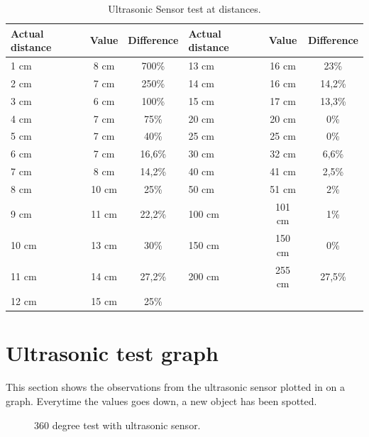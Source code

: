 \begin{table}[H]
	\centering
    \begin{tabular}{|lcc|lcc|}
    \hline  
    \rowcolor{DGray}
    \textbf{Actual distance} & \textbf{Value}  & \textbf{Difference} &\textbf{Actual distance} & \textbf{Value}  & \textbf{Difference}\\ \hline
    1 cm     & 8 cm     & 700\%  &    13 cm     & 16 cm     & 23\% \\
    2 cm     & 7 cm     & 250\%  &    14 cm     & 16 cm     & 14,2\% \\
    3 cm     & 6 cm     & 100\%  &    15 cm     & 17 cm     & 13,3\% \\
    4 cm     & 7 cm     & 75\%   &    20 cm     & 20 cm     & 0\% \\
    5 cm     & 7 cm     & 40\%   &    25 cm     & 25 cm     & 0\% \\
    6 cm     & 7 cm     & 16,6\% &    30 cm     & 32 cm     & 6,6\% \\
    7 cm     & 8 cm     & 14,2\% &    40 cm     & 41 cm     & 2,5\% \\
    8 cm     & 10 cm    & 25\%   &    50 cm     & 51 cm     & 2\% \\
    9 cm     & 11 cm    & 22,2\% &    100 cm    & 101 cm    & 1\% \\
    10 cm    & 13 cm    & 30\%   &    150 cm    & 150 cm    & 0\% \\
    11 cm    & 14 cm    & 27,2\% &    200 cm    & 255 cm    & 27,5\% \\
    12 cm    & 15 cm    & 25\%   &              &           &\\
    \hline 
    \end{tabular}
    \caption{\label{table:app_ultrasonic_sensor_test} Ultrasonic Sensor test at distances.}
\end{table}



\section{Ultrasonic test graph} \label{app:sonar-test-graph}
This section shows the observations from the ultrasonic sensor plotted in on a graph. Everytime the values goes down, a new object has been spotted.

\begin{figure}[H]
     \caption{\label{fig:sonar-test-graph} 360 degree test with ultrasonic sensor.}
\end{figure}
